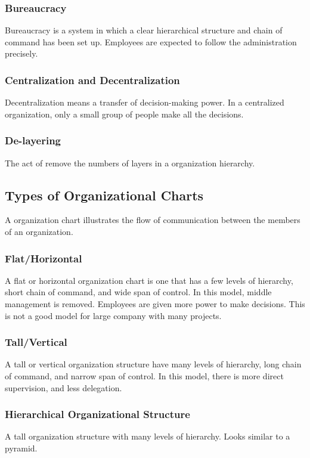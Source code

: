 \documentclass{standalone}
\begin{document}
\subsubsection{Bureaucracy}
Bureaucracy is a system in which a clear hierarchical structure and chain of command has been set up.
Employees are expected to follow the administration precisely.

\subsubsection{Centralization and Decentralization}
Decentralization means a transfer of decision-making power.
In a centralized organization, only a small group of people make all the decisions.

\subsubsection{De-layering}
The act of remove the numbers of layers in a organization hierarchy.

\subsection{Types of Organizational Charts}
A organization chart illustrates the flow of communication between the members of an organization.

\subsubsection{Flat/Horizontal}
A flat or horizontal organization chart is one that has a few levels of hierarchy, short chain of command, and wide span of control.
In this model, middle management is removed.
Employees are given more power to make decisions.
This is not a good model for large company with many projects.

\subsubsection{Tall/Vertical}
A tall or vertical organization structure have many levels of hierarchy, long chain of command, and narrow span of control.
In this model, there is more direct supervision, and less delegation.

\subsubsection{Hierarchical Organizational Structure}
A tall organization structure with many levels of hierarchy.
Looks similar to a pyramid.
\end{document}
